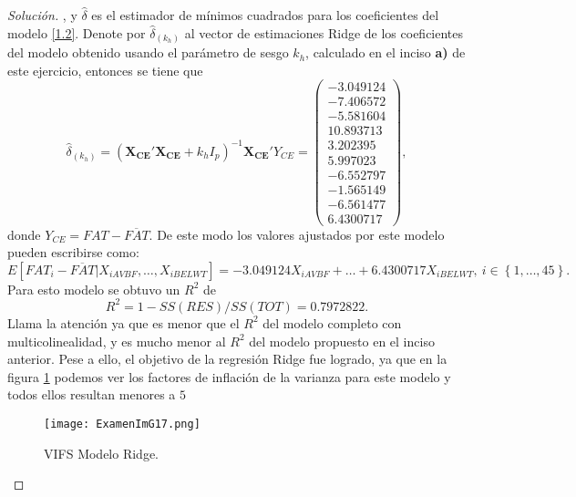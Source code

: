 \documentclass[10.5pt,notitlepage]{article}
\newenvironment{solucion}
  {\begin{proof}[Solución]}
  {\end{proof}}
\newcommand{\kis}[1]{\left\{ #1 \right\}}
\theoremstyle{plain}
\begin{document}
\begin{solucion}
\), y \(\hat{\delta}\) es el estimador de mínimos cuadrados para los coeficientes del modelo \eqref{1.2}.  Denote por \(\hat{\delta}_{(k_{h})}\) al vector de estimaciones Ridge de los coeficientes del modelo obtenido usando el parámetro de sesgo \(k_h\), calculado en el inciso \textbf{a)} de este ejercicio, entonces se tiene que
\begin{equation*}
    \hat{\delta}_{(k_{h})} = (\mathbf{X_{CE}}'\mathbf{X_{CE}} + k_h I_{p})^{-1}\mathbf{X_{CE}}'Y_{CE} =  \begin{pmatrix} -3.049124\\
  -7.406572\\
   -5.581604\\
   10.893713\\
    3.202395\\
    5.997023\\
 -6.552797\\
  -1.565149\\
  -6.561477\\
  6.4300717\end{pmatrix},
\end{equation*}
donde \(Y_{CE} = FAT - \overline{FAT}\). De este modo los valores ajustados por este modelo pueden escribirse como:
\begin{equation*}
 E[FAT_{i} - \overline{FAT}| X_{iAVBF}, \hdots, X_{iBELWT}] =  -3.049124 X_{iAVBF} + \hdots+  6.4300717X_{iBELWT}, \ i \in \kis{1, \hdots, 45}. 
\end{equation*}
Para esto modelo se obtuvo un \(R^2\) de 
\begin{equation*}
    R^2 = 1 - SS(RES)/SS(TOT) = 0.7972822. 
\end{equation*}
Llama la atención ya que es menor que el \(R^2\) del modelo completo con multicolinealidad, y es mucho menor al \(R^2\) del modelo propuesto en el inciso anterior. Pese a ello, el objetivo de la regresión Ridge fue logrado, ya que en la figura \ref{fig99} podemos ver los factores de inflación de la varianza para este modelo y todos ellos resultan menores a \(5\)
\begin{figure}[htb]
 \centering
 \texttt{[image: ExamenImG17.png]}
 \caption{VIFS Modelo Ridge.}
\label{fig99}
\end{figure}
\end{solucion}
\end{document}
